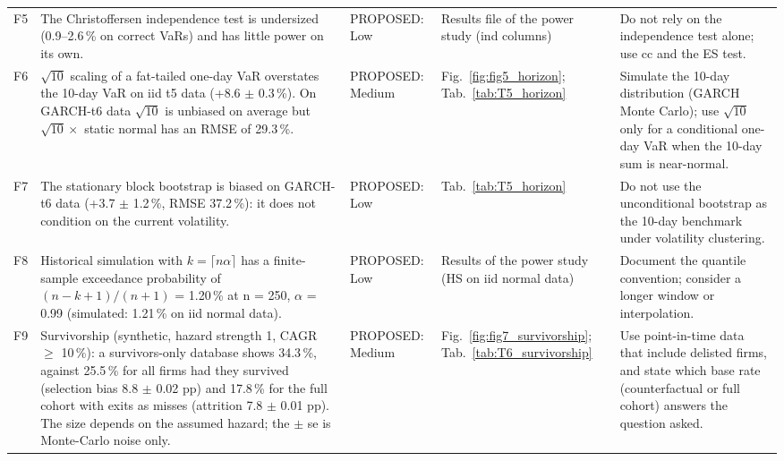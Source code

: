 \begin{table}[H]
\begin{tabular}{>{\raggedright\arraybackslash}p{0.5cm}>{\raggedright\arraybackslash}p{5.2cm}>{\raggedright\arraybackslash}p{1.8cm}>{\raggedright\arraybackslash}p{2.7cm}>{\raggedright\arraybackslash}p{3.5cm}}
F5 & The Christoffersen independence test is undersized (0.9--2.6\,\% on correct VaRs) and has little power on its own. & PROPOSED: Low & Results file of the power study (ind columns) & Do not rely on the independence test alone; use cc and the ES test. \\
F6 & $\sqrt{10}$ scaling of a fat-tailed one-day VaR overstates the 10-day VaR on iid t5 data (+8.6 $\pm$ 0.3\,\%). On GARCH-t6 data $\sqrt{10}$ is unbiased on average but $\sqrt{10}\times$ static normal has an RMSE of 29.3\,\%. & PROPOSED: Medium & Fig.~\ref{fig:fig5_horizon}; Tab.~\ref{tab:T5_horizon} & Simulate the 10-day distribution (GARCH Monte Carlo); use $\sqrt{10}$ only for a conditional one-day VaR when the 10-day sum is near-normal. \\
F7 & The stationary block bootstrap is biased on GARCH-t6 data (+3.7 $\pm$ 1.2\,\%, RMSE 37.2\,\%): it does not condition on the current volatility. & PROPOSED: Low & Tab.~\ref{tab:T5_horizon} & Do not use the unconditional bootstrap as the 10-day benchmark under volatility clustering. \\
F8 & Historical simulation with $k = \lceil n\alpha\rceil$ has a finite-sample exceedance probability of $(n-k+1)/(n+1)$ = 1.20\,\% at n = 250, $\alpha$ = 0.99 (simulated: 1.21\,\% on iid normal data). & PROPOSED: Low & Results of the power study (HS on iid normal data) & Document the quantile convention; consider a longer window or interpolation. \\
F9 & Survivorship (synthetic, hazard strength 1, CAGR $\ge$ 10\,\%): a survivors-only database shows 34.3\,\%, against 25.5\,\% for all firms had they survived (selection bias 8.8 $\pm$ 0.02 pp) and 17.8\,\% for the full cohort with exits as misses (attrition 7.8 $\pm$ 0.01 pp). The size depends on the assumed hazard; the $\pm$ se is Monte-Carlo noise only. & PROPOSED: Medium & Fig.~\ref{fig:fig7_survivorship}; Tab.~\ref{tab:T6_survivorship} & Use point-in-time data that include delisted firms, and state which base rate (counterfactual or full cohort) answers the question asked. \\
\bottomrule
\end{tabular}
\end{table}
